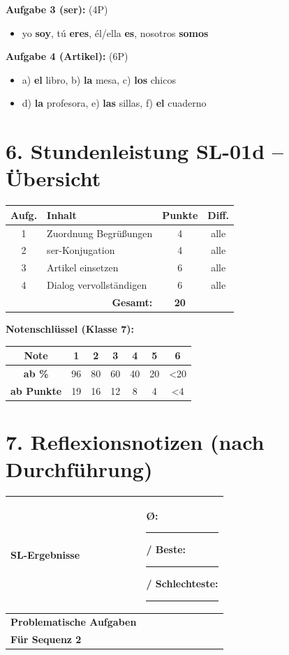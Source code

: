 \documentclass[11pt, a4paper]{article}
\newcommand{\loesung}[1]{\textcolor{loesung}{\textbf{#1}}}
\begin{document}
\textbf{Aufgabe 3 (ser):} (4P)
\begin{itemize}
    \item yo \loesung{soy}, tú \loesung{eres}, él/ella \loesung{es}, nosotros \loesung{somos}
\end{itemize}

\textbf{Aufgabe 4 (Artikel):} (6P)
\begin{itemize}
    \item a) \loesung{el} libro, b) \loesung{la} mesa, c) \loesung{los} chicos
    \item d) \loesung{la} profesora, e) \loesung{las} sillas, f) \loesung{el} cuaderno
\end{itemize}

\section*{6. Stundenleistung SL-01d -- Übersicht}

\begin{tabular}{|c|l|c|c|}
\hline
\textbf{Aufg.} & \textbf{Inhalt} & \textbf{Punkte} & \textbf{Diff.} \\
\hline
1 & Zuordnung Begrüßungen & 4 & alle \\
\hline
2 & ser-Konjugation & 4 & alle \\
\hline
3 & Artikel einsetzen & 6 & alle \\
\hline
4 & Dialog vervollständigen & 6 & alle \\
\hline
\multicolumn{2}{|r|}{\textbf{Gesamt:}} & \textbf{20} & \\
\hline
\end{tabular}

\vspace{1em}

\textbf{Notenschlüssel (Klasse 7):}

\begin{tabular}{|c|c|c|c|c|c|c|}
\hline
\textbf{Note} & 1 & 2 & 3 & 4 & 5 & 6 \\
\hline
\textbf{ab \%} & 96 & 80 & 60 & 40 & 20 & <20 \\
\hline
\textbf{ab Punkte} & 19 & 16 & 12 & 8 & 4 & <4 \\
\hline
\end{tabular}

\section*{7. Reflexionsnotizen (nach Durchführung)}

\begin{tabularx}{\textwidth}{|l|X|}
\hline
\textbf{SL-Ergebnisse} & Ø: \rule{2cm}{0.4pt} / Beste: \rule{1cm}{0.4pt} / Schlechteste: \rule{1cm}{0.4pt} \\[1.5em]
\hline
\textbf{Problematische Aufgaben} & \\[2em]
\hline
\textbf{Für Sequenz 2} & \\[2em]
\hline
\end{tabularx}
\end{document}
